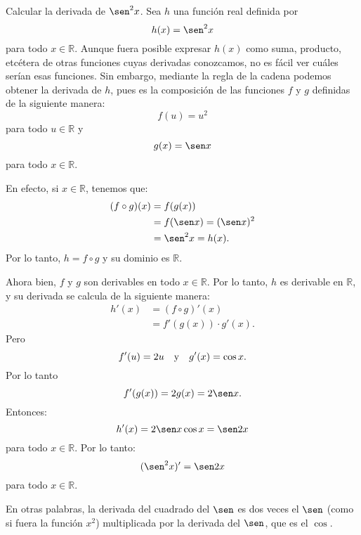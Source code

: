 \begin{exemplo}[Solución]{%
Calcular la derivada de $\sen^2 x$.
}%
Sea $h$ una función real definida por
\[
h(x) = \sen^2 x
\]
para todo $x\in\mathbb{R}$. Aunque fuera posible expresar $h(x)$ como suma, producto, etcétera de
otras funciones cuyas derivadas conozcamos, no es fácil ver cuáles serían esas funciones. Sin
embargo, mediante la regla de la cadena podemos obtener la derivada de $h$, pues es la composición
de las funciones $f$ y $g$ definidas de la siguiente manera:
\[
f(u) = u^2
\]
para todo $u\in\mathbb{R}$ y
\[
g(x) = \sen x
\]
para todo $x\in\mathbb{R}$.

En efecto, si $x\in\mathbb{R}$, tenemos que:
\begin{align*}
(f\circ g)(x) &= f(g(x)) \\
   &= f(\sen x) = (\sen x)^2 \\
   &= \sen^2 x = h(x).
\end{align*}
Por lo tanto, $h = f\circ g$ y su dominio es $\mathbb{R}$.

Ahora bien, $f$ y $g$ son derivables en todo $x\in\mathbb{R}$. Por lo tanto, $h$ es derivable en
$\mathbb{R}$, y su derivada se calcula de la siguiente manera:
\begin{align*}
h'(x) &= (f\circ g)'(x) \\
   &= f'(g(x))\cdot g'(x).
\end{align*}
Pero
\[
f'(u) = 2u \quad\text{y}\quad g'(x) = \cos x.
\]
Por lo tanto
\[
f'(g(x)) = 2g(x) = 2 \sen x.
\]
Entonces:
\[
h'(x) = 2 \sen x \cos x = \sen 2x
\]
para todo $x\in\mathbb{R}$. Por lo tanto:
\[
(\sen^2 x)' = \sen 2x
\]
para todo $x\in\mathbb{R}$.

En otras palabras, la derivada del cuadrado del $\sen$ es dos veces el $\sen$ (como si fuera la
función $x^2$) multiplicada por la derivada del $\sen$, que es el $\cos$.
\end{exemplo}


